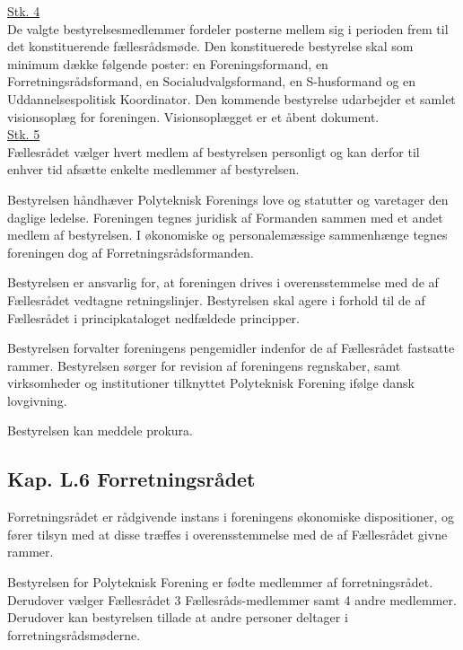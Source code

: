 \begin{list}
\underline{Stk. 4}\\
De valgte bestyrelsesmedlemmer fordeler posterne mellem sig i perioden frem til det konstituerende fællesrådsmøde. Den konstituerede bestyrelse skal som minimum dække følgende poster: en Foreningsformand, en Forretningsrådsformand, en Socialudvalgsformand, en S-husformand og en Uddannelsespolitisk Koordinator. Den kommende bestyrelse udarbejder et samlet visionsoplæg for foreningen. Visionsoplægget er et åbent dokument.\\

\underline{Stk. 5}\\ 
Fællesrådet vælger hvert medlem af bestyrelsen personligt og kan derfor til enhver tid afsætte enkelte medlemmer af bestyrelsen.\\

\item Bestyrelsen håndhæver Polyteknisk Forenings love og statutter og varetager den daglige ledelse. Foreningen tegnes juridisk af Formanden sammen med et andet medlem af bestyrelsen. I økonomiske og personalemæssige sammenhænge tegnes foreningen dog af Forretningsrådsformanden.\\

\item Bestyrelsen er ansvarlig for, at foreningen drives i overensstemmelse med de af Fællesrådet vedtagne retningslinjer. Bestyrelsen skal agere i forhold til de af Fællesrådet i principkataloget nedfældede principper.\\

\item Bestyrelsen forvalter foreningens pengemidler indenfor de af Fællesrådet fastsatte rammer. Bestyrelsen sørger for revision af foreningens regnskaber, samt virksomheder og institutioner tilknyttet Polyteknisk Forening ifølge dansk lovgivning.

\item Bestyrelsen kan meddele prokura.

\subsection*{Kap. L.6 Forretningsrådet}
\item Forretningsrådet er rådgivende instans i foreningens økonomiske dispositioner, og fører tilsyn med at disse træffes i overensstemmelse med de af Fællesrådet givne rammer.\\

\item Bestyrelsen for Polyteknisk Forening er fødte medlemmer af forretningsrådet. Derudover vælger Fællesrådet 3 Fællesråds-medlemmer samt 4 andre medlemmer. Derudover kan bestyrelsen tillade at andre personer deltager i forretningsrådsmøderne.


\end{list}
